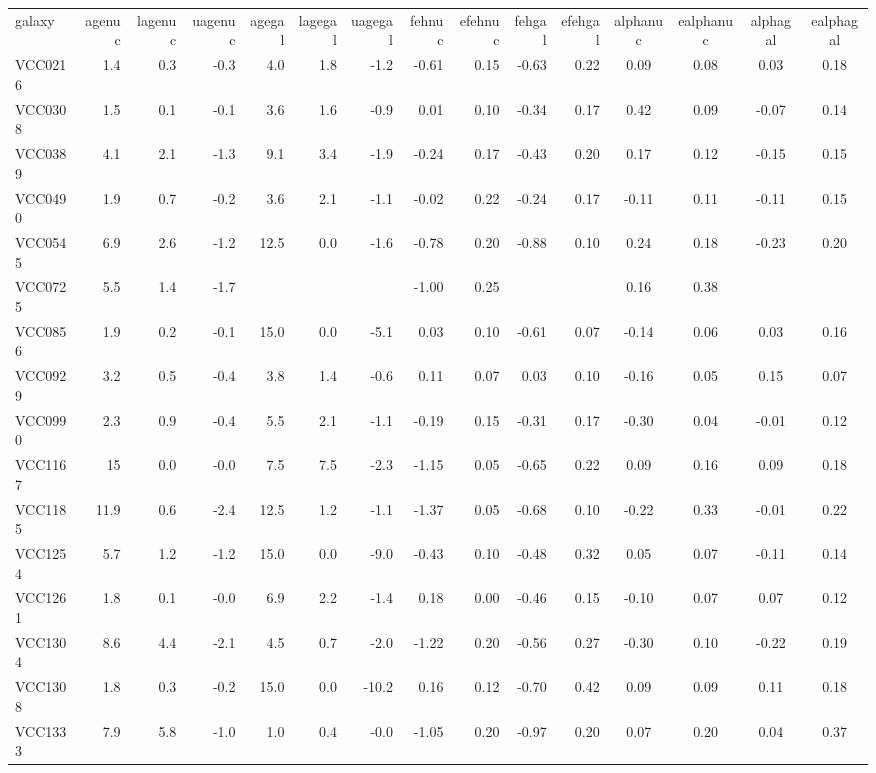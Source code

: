 \begin{tabular}{lrrrrrrrrrrcccc}
galaxy & agenuc & lagenuc & uagenuc & agegal & lagegal & uagegal & fehnuc & efehnuc & fehgal & efehgal & alphanuc & ealphanuc & alphagal & ealphagal \\
VCC0216 & 1.4 & 0.3 & -0.3  & 4.0 & 1.8 & -1.2  & -0.61 & 0.15 & -0.63 & 0.22 &  0.09 & 0.08 & 0.03 & 0.18 \\
VCC0308 & 1.5 & 0.1 & -0.1  & 3.6 & 1.6 & -0.9  &  0.01 & 0.10 & -0.34 & 0.17 &  0.42 & 0.09 & -0.07 & 0.14 \\
VCC0389 & 4.1 & 2.1 & -1.3  & 9.1 & 3.4 & -1.9  & -0.24 & 0.17 & -0.43 & 0.20 &  0.17 & 0.12 & -0.15 & 0.15 \\
VCC0490 & 1.9 & 0.7 & -0.2  & 3.6 & 2.1 & -1.1  & -0.02 & 0.22 & -0.24 & 0.17 &  -0.11 & 0.11 & -0.11 & 0.15 \\
VCC0545 & 6.9 & 2.6 & -1.2  & 12.5& 0.0 & -1.6  & -0.78 & 0.20 & -0.88 & 0.10 &  0.24 & 0.18 & -0.23 & 0.20 \\
VCC0725 & 5.5 & 1.4 & -1.7  &     &     &       & -1.00 & 0.25 &      &       &  0.16 & 0.38 &      & \\
VCC0856 & 1.9 & 0.2 & -0.1  & 15.0& 0.0 & -5.1  & 0.03 & 0.10 & -0.61 & 0.07 &  -0.14 & 0.06 & 0.03 & 0.16 \\
VCC0929 & 3.2 & 0.5 & -0.4  & 3.8 & 1.4 & -0.6  & 0.11 & 0.07 & 0.03 & 0.10 &  -0.16 & 0.05 & 0.15 & 0.07 \\
VCC0990 & 2.3 & 0.9 & -0.4  & 5.5 & 2.1 & -1.1  & -0.19 & 0.15 & -0.31 & 0.17 &  -0.30 & 0.04 & -0.01 & 0.12 \\
VCC1167 & 15 & 0.0 & -0.0   & 7.5 & 7.5 & -2.3  & -1.15& 0.05 & -0.65 & 0.22 &  0.09 & 0.16 & 0.09 & 0.18 \\
VCC1185 & 11.9& 0.6 & -2.4  & 12.5& 1.2 & -1.1  & -1.37 & 0.05 & -0.68 & 0.10 &  -0.22 & 0.33 & -0.01 & 0.22 \\
VCC1254 & 5.7 & 1.2 & -1.2  & 15.0& 0.0 & -9.0  & -0.43 & 0.10 & -0.48 & 0.32 &  0.05 & 0.07 & -0.11 & 0.14 \\
VCC1261 & 1.8 & 0.1 & -0.0   & 6.9 & 2.2 & -1.4  & 0.18& 0.00 & -0.46 & 0.15 &  -0.10 & 0.07 & 0.07 & 0.12 \\
VCC1304 & 8.6 & 4.4 & -2.1  & 4.5 & 0.7 & -2.0  & -1.22 & 0.20 & -0.56 & 0.27 &  -0.30 & 0.10 & -0.22 & 0.19 \\
VCC1308 & 1.8 & 0.3 & -0.2  & 15.0& 0.0 & -10.2  & 0.16 & 0.12 & -0.70 & 0.42 &  0.09 & 0.09 & 0.11 & 0.18 \\
VCC1333 & 7.9 & 5.8 & -1.0  & 1.0 & 0.4 & -0.0   &-1.05 & 0.20 & -0.97 & 0.20 &  0.07 & 0.20 & 0.04 & 0.37 \\

\end{tabular}
